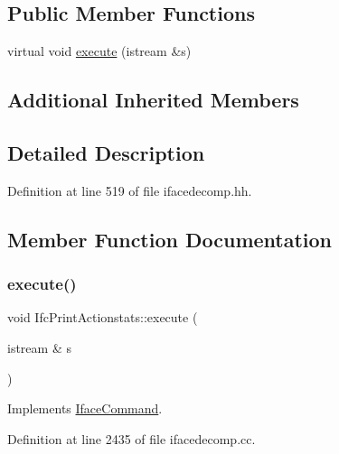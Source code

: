 \subsection*{Public Member Functions}
\begin{DoxyCompactItemize}
\item 
virtual void \mbox{\hyperlink{class_ifc_print_actionstats_a46e637cead1a46f203fa2c1571f0b955}{execute}} (istream \&s)
\end{DoxyCompactItemize}
\subsection*{Additional Inherited Members}


\subsection{Detailed Description}


Definition at line 519 of file ifacedecomp.\+hh.



\subsection{Member Function Documentation}
\mbox{\label{class_ifc_print_actionstats_a46e637cead1a46f203fa2c1571f0b955}} 
\subsubsection{\texorpdfstring{execute()}{execute()}}
{\footnotesize\ttfamily void Ifc\+Print\+Actionstats\+::execute (\begin{DoxyParamCaption}\item[{istream \&}]{s }\end{DoxyParamCaption})\hspace{0.3cm}{\ttfamily [virtual]}}



Implements \mbox{\hyperlink{class_iface_command_af10e29cee2c8e419de6efe9e680ad201}{Iface\+Command}}.



Definition at line 2435 of file ifacedecomp.\+cc.

